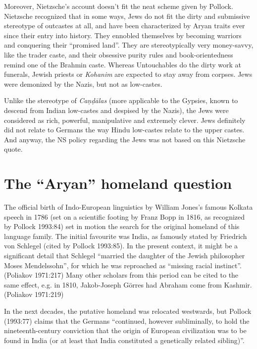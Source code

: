 Moreover, Nietzsche’s account doesn’t fit the neat scheme given by Pollock. Nietzsche recognized that in some ways, Jews do not fit the dirty and submissive stereotype of outcastes at all, and have been characterized by Aryan traits ever since their entry into history. They ennobled themselves by becoming warriors and conquering their “promised land”. They are stereotypically very money-savvy, like the trader caste, and their obsessive purity rules and book-orientedness remind one of the Brahmin caste. Whereas Untouchables do the dirty work at funerals, Jewish priests or {\sl Kohanim} are expected to stay away from corpses. Jews were demonized by the Nazis, but not as low-castes.

Unlike the stereotype of {\sl Caṇḍālas} (more applicable to the Gypsies, known to descend from Indian low-castes and despised by the Nazis), the Jews were considered as rich, powerful, manipulative and extremely clever. Jews definitely did not relate to Germans the way Hindu low-castes relate to the upper castes. And anyway, the NS policy regarding the Jews was not based on this Nietzsche quote.

\section*{The “Aryan” homeland question}

The official birth of Indo-European linguistics by William Jones’s famous Kolkata speech in 1786 (set on a scientific footing by Franz Bopp in 1816, as recognized by Pollock 1993:84) set in motion the search for the original homeland of this language family. The initial favourite was India, as famously stated by Friedrich von Schlegel (cited by Pollock 1993:85). In the present context, it might be a significant detail that Schlegel “married the daughter of the Jewish philosopher Moses Mendelssohn”, for which he was reproached as “missing racial instinct”. (Poliakov 1971:217) Many other scholars from this period can be cited to the same effect, e.g. in 1810, Jakob-Joseph Görres had Abraham come from Kashmir. (Poliakov 1971:219)

In the next decades, the putative homeland was relocated westwards, but Pollock (1993:77) claims that the Germans “continued, however subliminally, to hold the nineteenth-century conviction that the origin of European civilization was to be found in India (or at least that India constituted a genetically related sibling)”. 

